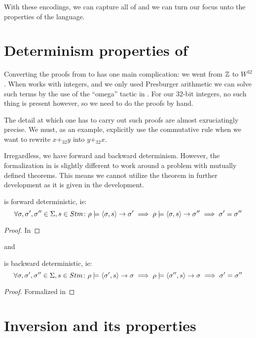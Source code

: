 With these encodings, we can capture all of \januso{} and we can turn
our focus unto the properties of the language.

\section{Determinism properties of \januso{}}

Converting the proofs from \janusz{} to \januso{} has one main
complication: we went from $\mathbb{Z}$ to $W^{32}$. When \coq{} works with
integers, and we only used Presburger
arithmetic\cite{cooper+1972:theorem-prooving} we can solve such terms
by the use of the ``omega'' tactic in \coq{}. For our 32-bit integers,
no such thing is present however, so we need to do the proofs by hand.

The detail at which one has to carry out such proofs are almost
exruciatingly precise. We must, as an example, explicitly use the
commutative rule when we want to rewrite $x +_{32} y$ into $y +_{32}
x$.

Irregardless, we have forward and backward determinism. However, the
formalization in \coq{} is slightly different to work around a problem
with mutually defined theorems. This means we cannot utilize the
theorem in further development as it is given in the development.
\begin{thm}
\label{thm:j1-fwd-det}
  \januso{} is forward deterministic, ie:
  \begin{equation*}
    \forall \sigma, \sigma', \sigma'' \in \Sigma, s \in Stm \colon
    \rho |= \langle \sigma, s \rangle -> \sigma' \implies \rho |= \langle \sigma, s \rangle -> \sigma'' \implies \sigma' = \sigma''
  \end{equation*}
\end{thm}
\begin{proof}
  In \coq{}
\end{proof}
and
\begin{thm}
\label{thm:j1-bwd-det}
  \januso{} is backward deterministic, ie:
  \begin{equation*}
    \forall \sigma, \sigma', \sigma'' \in \Sigma, s \in Stm \colon
    \rho |= \langle \sigma', s \rangle -> \sigma \implies \rho |= \langle \sigma'', s \rangle -> \sigma \implies \sigma' = \sigma''
  \end{equation*}
\end{thm}
\begin{proof}
  Formalized in \coq{}
\end{proof}

\section{Inversion and its properties}

